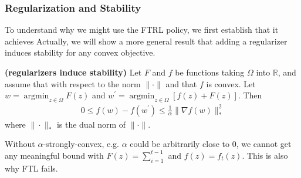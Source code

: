 \documentclass{article}
\newcommand{\bfs}[1]{\textbf{({#1}) }}
\begin{document}
\subsubsection{Regularization and Stability}
To understand why we might use the FTRL policy, we first establish that it achieves  Actually, we will show a more general result that adding a regularizer induces stability for any convex objective.

\begin{lema}\bfs{regularizers induce stability}\label{lem:bfsfa}
  Let $F$ and $f$ be functions taking $\Omega$ into $\mathbb{R}$, and assume that  with respect to the norm $\|\cdot\|$ and that $f$ is convex. Let $w=\operatorname{argmin}_{z \in \Omega} F(z)$ and $w^{\prime}=\operatorname{argmin}_{z \in \Omega}[f(z)+F(z)]$. Then
\begin{align*}
0 \leq f(w)-f\left(w^{\prime}\right) \leq \frac{1}{\alpha}\|\nabla f(w)\|_{*}^{2}
\end{align*}
where $\|\cdot\|_{*}$ is the dual norm of $\|\cdot\|$.
\end{lema}
\begin{rema}\label{rem:poofqfda}
Without $\alpha$-strongly-convex, e.g. $\alpha$ could be arbitrarily close to $0$, we cannot get any meaningful bound  with $F(z)=\sum_{i=1}^{t-1}$ and $f(z)=f_t(z)$. This is also why FTL fails.
\end{rema}
\end{document}
